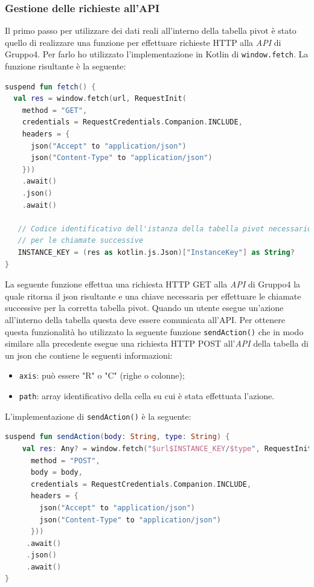 \subsubsection{Gestione delle richieste all'API}
Il primo passo per utilizzare dei dati reali all'interno della tabella pivot è stato quello di realizzare una funzione per effettuare richieste HTTP alla \emph{API} di Gruppo4. Per farlo ho utilizzato l'implementazione in Kotlin di \verb|window.fetch|. La funzione risultante è la seguente:
\begin{lstlisting}[caption={Funzione fetch()}, label={lst:fetch}, language=Kotlin]
suspend fun fetch() {
  val res = window.fetch(url, RequestInit(
    method = "GET",
    credentials = RequestCredentials.Companion.INCLUDE,
    headers = {
      json("Accept" to "application/json")
      json("Content-Type" to "application/json")
    }))
    .await()
    .json()
    .await()

   // Codice identificativo dell'istanza della tabella pivot necessario
   // per le chiamate successive
   INSTANCE_KEY = (res as kotlin.js.Json)["InstanceKey"] as String?
}
\end{lstlisting}

\noindent
La seguente funzione effettua una richiesta HTTP GET alla \emph{API} di Gruppo4 la quale ritorna il json risultante e una chiave necessaria per effettuare le chiamate successive per la corretta tabella pivot. Quando un utente esegue un'azione all'interno della tabella questa deve essere comunicata all'API. Per ottenere questa funzionalità ho utilizzato la seguente funzione \verb|sendAction()| che in modo similare alla precedente esegue una richiesta HTTP POST all'\emph{API} della tabella di un json che contiene le seguenti informazioni:
\begin{itemize}
	\item \verb|axis|: può essere "R" o "C" (righe o colonne);
	\item \verb|path|: array identificativo della cella su cui è stata effettuata l'azione.
\end{itemize}
L'implementazione di \verb|sendAction()| è la seguente: 
\begin{lstlisting}[caption={Funzione sendAction()}, label={lst:sendaction}, language=Kotlin]
suspend fun sendAction(body: String, type: String) {
    val res: Any? = window.fetch("$url$INSTANCE_KEY/$type", RequestInit(
      method = "POST",
      body = body,
      credentials = RequestCredentials.Companion.INCLUDE,
      headers = {
        json("Accept" to "application/json")
        json("Content-Type" to "application/json")
      }))
     .await()
     .json()
     .await()
}
\end{lstlisting}

